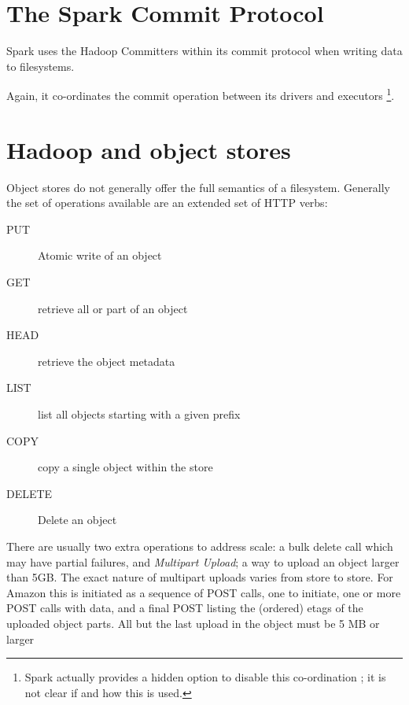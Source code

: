 \documentclass[9pt,technote]{IEEEtran}
\begin{document}
\section{The Spark Commit Protocol}

Spark uses the Hadoop Committers within its commit protocol when
writing data to filesystems.

Again, it co-ordinates the commit operation between its drivers and executors
\footnote{Spark actually provides a hidden option to disable this
co-ordination  \cite{SPARK-8029}; it is not clear if and how this is used.}.


\section{Hadoop and object stores}
\label{sec:object-stores}





Object stores do not generally offer the full semantics of a filesystem.
Generally the set of operations available are an extended set of HTTP verbs:

\begin{description}
  \item[PUT] Atomic write of an object
  \item[GET] retrieve all or part of an object
  \item[HEAD] retrieve the object metadata
  \item[LIST] list all objects starting with a given prefix
  \item[COPY] copy a single object within the store
  \item[DELETE] Delete an object
\end{description}

There are usually two extra operations to address scale:
 a bulk delete call which may have partial failures,
and \emph{Multipart Upload}; a way to upload an object larger than 5GB\@.
The exact nature of multipart uploads varies from store to store.
For Amazon this is initiated as a sequence of POST calls, one to initiate,
one or more POST calls with data, and a final POST listing the (ordered)
etags of the uploaded object parts.
All but the last upload in the object must be 5 MB or larger
\end{document}
